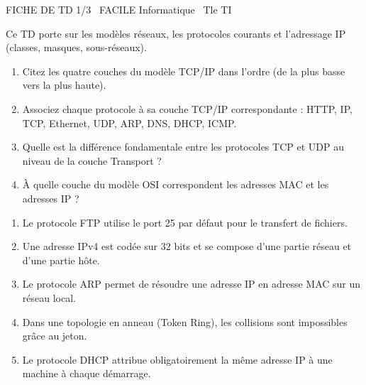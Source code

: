 \documentclass[11pt]{article}
\begin{document}
\begin{tcolorbox}[enhanced,colback=popink,colframe=popink,arc=10pt,boxrule=0pt,left=12pt,right=12pt,top=9pt,bottom=9pt]
{\color{white}\popxbold\small FICHE DE TD 1/3 \textbullet\ FACILE \hfill Informatique \textbullet\ Tle TI\par}
\end{tcolorbox}
\vspace{4pt}
Ce TD porte sur les modèles réseaux, les protocoles courants et l'adressage IP (classes, masques, sous-réseaux).

\begin{exercice}
\begin{enumerate}
    \item Citez les quatre couches du modèle TCP/IP dans l'ordre (de la plus basse vers la plus haute).
    \item Associez chaque protocole à sa couche TCP/IP correspondante : HTTP, IP, TCP, Ethernet, UDP, ARP, DNS, DHCP, ICMP.
    \item Quelle est la différence fondamentale entre les protocoles TCP et UDP au niveau de la couche Transport ?
    \item À quelle couche du modèle OSI correspondent les adresses MAC et les adresses IP ?
\end{enumerate}
\end{exercice}

\begin{exercice}
\begin{enumerate}
    \item Le protocole FTP utilise le port 25 par défaut pour le transfert de fichiers.
    \item Une adresse IPv4 est codée sur 32 bits et se compose d'une partie réseau et d'une partie hôte.
    \item Le protocole ARP permet de résoudre une adresse IP en adresse MAC sur un réseau local.
    \item Dans une topologie en anneau (Token Ring), les collisions sont impossibles grâce au jeton.
    \item Le protocole DHCP attribue obligatoirement la même adresse IP à une machine à chaque démarrage.
\end{enumerate}
\end{exercice}
\end{document}
